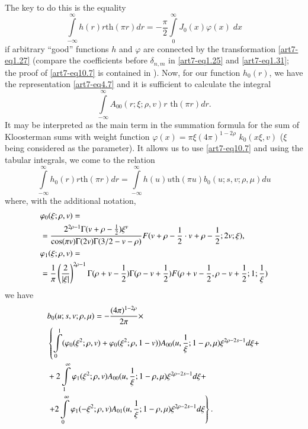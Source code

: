 The key to do this is the equality
\setcounter{section}{10}
\begin{equation}
\int\limits^\infty_{-\infty} h(r) r \text{th} (\pi r) dr = -\frac{\pi}{2} \int\limits^\infty_0 J_0(x) \varphi (x) \; d x\label{art7-eq10.7} 
\end{equation}
if arbitrary ``good'' functions $h$ and $\varphi$ are connected by the transformation \eqref{art7-eq1.27} (compare the coefficients before $\delta_{n,m}$ in \eqref{art7-eq1.25} and \eqref{art7-eq1.31}; the proof of \eqref{art7-eq10.7} is contained in \cite{art7-key1}). Now, for our function $h_0(r)$, we have the representation \eqref{art7-eq4.7} and it is sufficient to calculate the integral
\begin{equation}
\int\limits^\infty_{-\infty} A_{00} (r;\xi; \rho, v) r \text{ th} (\pi r) d r. \label{art7-eq10.8}
\end{equation}
It may be interpreted as the main term in the summation formula for the sum of Kloosterman sums with weight function $\varphi (x) = \pi \xi (4 \pi)^{1-2\rho}$ $k_0 (x \xi, v)$ ($\xi$ being considered as the parameter). It allows us to use \eqref{art7-eq10.7} and using the tabular integrals, we come to the relation 
\begin{equation}
\int\limits^\infty_{-\infty} h_0 (r) r \text{th} (\pi r) dr = \int\limits^\infty_{-\infty} h (u) u \text{th} (\pi u) b_0 (u; s, v; \rho, \mu) du \label{art7-eq10.9}
\end{equation}
where, with the additional notation,
\begin{align}
&\varphi_0 (\xi; \rho, v)  = \label{art7-eq10.10}\\
& = \frac{2^{2\rho -1} \Gamma (v+ \rho - \frac{1}{2}) \xi^v}{\cos (\pi v) \Gamma (2v) \Gamma (3/2 - v-\rho)} F (v+ \rho - \frac{1}{2} \cdot v + \rho - \frac{1}{2} ; 2 v ; \xi),  \notag\\
&\varphi_1 (\xi; \rho, v) = \label{art7-eq10.11}\\
& =\frac{1}{\pi} \left(\frac{2}{|\xi|} \right)^{2\rho-1} \Gamma (\rho + v - \frac{1}{2}) \Gamma (\rho - v + \frac{1}{2}) F (\rho + v -\frac{1}{2}, \rho - v + \frac{1}{2}; 1 ; \frac{1}{\xi}) \notag
\end{align}\pageoriginale 
we have
\begin{align}
& b_0 (u; s, v; \rho, \mu) = - \frac{(4\pi)^{1-2 \rho}}{2 \pi }\times \label{art7-eq10.12}\\
& \left\{\int\limits^1_0 (\varphi_0 (\xi^2; \rho, v) + \varphi_0 (\xi^2; \rho, 1-v)) A_{00} (u, \frac{1}{\xi}; 1 - \rho, \mu) \xi^{2\rho - 2 s -1} d \xi +  \right. \notag\\
&+ 2 \int\limits^\infty_1 \varphi_1(\xi^2; \rho, v) A_{00} (u, \frac{1}{\xi}; 1 - \rho, \mu) \xi^{2 \rho - 2 s -1} d \xi + \notag \\
&\left. + 2 \int\limits^\infty_0 \varphi_1 (-\xi^2 ; \rho, v) A_{01} (u, \frac{1}{\xi}; 1 - \rho, \mu)  \xi^{2\rho - 2 s -1} d \xi \right\}. \notag
\end{align}

